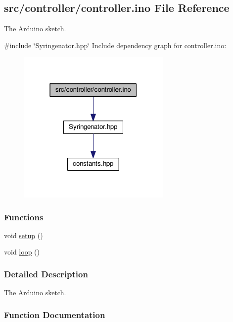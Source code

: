 \hypertarget{controller_8ino}{}\subsection{src/controller/controller.ino File Reference}
\label{controller_8ino}


The Arduino sketch.  


{\ttfamily \#include \char`\"{}Syringenator.\+hpp\char`\"{}}\newline
Include dependency graph for controller.\+ino\+:
\nopagebreak
\begin{figure}[H]
\begin{center}
\leavevmode
\includegraphics[width=211pt]{controller_8ino__incl}
\end{center}
\end{figure}
\subsubsection*{Functions}
\begin{DoxyCompactItemize}
\item 
void \mbox{\hyperlink{controller_8ino_a4fc01d736fe50cf5b977f755b675f11d}{setup}} ()
\item 
void \mbox{\hyperlink{controller_8ino_afe461d27b9c48d5921c00d521181f12f}{loop}} ()
\end{DoxyCompactItemize}


\subsubsection{Detailed Description}
The Arduino sketch. 



\subsubsection{Function Documentation}
\mbox{\label{controller_8ino_afe461d27b9c48d5921c00d521181f12f}} 
